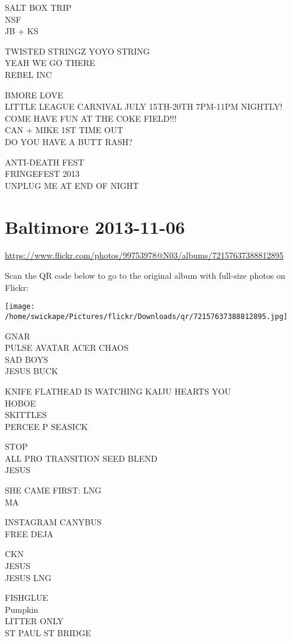 \documentclass[10pt,letterpaper]{article}
\begin{document}
SALT BOX TRIP\\
NSF\\
JB + KS

TWISTED STRINGZ YOYO STRING\\
YEAH WE GO THERE\\
REBEL INC

BMORE LOVE\\
LITTLE LEAGUE CARNIVAL JULY 15TH{-}20TH 7PM{-}11PM NIGHTLY! COME HAVE FUN AT THE COKE FIELD!!!\\
CAN + MIKE 1ST TIME OUT\\
DO YOU HAVE A BUTT RASH?

ANTI{-}DEATH FEST\\
FRINGEFEST 2013\\
UNPLUG ME AT END OF NIGHT
\pagebreak

\section*{Baltimore 2013-11-06}

\url{https://www.flickr.com/photos/99753978@N03/albums/72157637388812895}

Scan the QR code below to go to the original album with full-size photos on Flickr:

\texttt{[image: /home/swickape/Pictures/flickr/Downloads/qr/72157637388812895.jpg]}
\pagebreak

GNAR\\
PULSE AVATAR ACER CHAOS\\
SAD BOYS\\
JESUS BUCK

KNIFE FLATHEAD IS WATCHING KAIJU HEARTS YOU\\
HOBOE\\
SKITTLES\\
PERCEE P SEASICK

STOP\\
ALL PRO TRANSITION SEED BLEND\\
JESUS

SHE CAME FIRST: LNG\\
MA

INSTAGRAM CANYBUS\\
FREE DEJA

CKN\\
JESUS\\
JESUS LNG

FISHGLUE\\
Pumpkin\\
LITTER ONLY\\
ST PAUL ST BRIDGE
\end{document}

